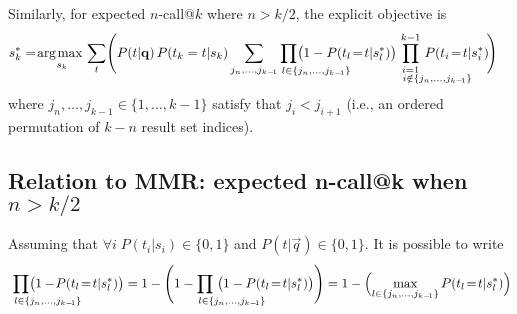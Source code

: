 Similarly, for expected $n$-call@$k$ where $n \! > \! k/2$, the explicit objective is
\begin{align}
  & s_k^* = \argmax_{s_k} \sum_t \Biggl( P(t|\vec{q}) \, P(t_k=t|s_k) \sum_{j_n, \dots, j_{k-\!1}} \hspace{-14mm} \prod_{\hspace{14.5mm} l \in \{j_n, \dots, j_{k-\!1}\}} \hspace{-14mm} \bigl(1 - P(t_l\!=\!t|s_l^*) \bigr) \hspace{-13mm} \prod_{\substack{i=1 \\ \hspace{14mm} i \notin \{j_n, \dots, j_{k-\!1}\}}}^{k-1} \hspace{-13mm} P(t_i\!=\!t|s_i^*) \!\Biggr) \label{eq.ncall.alt2}
\end{align}
where $j_n, \dots, j_{k-1} \in \{1,\ldots,k-1\}$ satisfy 
that $j_i < j_{i+1}$ (i.e.,
an ordered permutation of $k-n$ result set indices).

\subsection{Relation to MMR: expected n-call@k when $n>k/2$}
\label{appendix.2call}

Assuming that $\forall i \; P(t_i|s_i) \in \{0,1\}$ and $P(t|\vec{q}) \in \{0,1\}$. It is possible to write
\begin{align*}
  \hspace{-13mm} \prod_{\hspace{14.5mm} l \in \{j_n, \dots, j_{k-\!1}\}} \hspace{-14mm} \bigl( 1 - \!P(t_l\!=\!t|s_l^*) \bigr) 
  = 1 - \Biggl( 1 - \hspace{-14mm} \prod_{\hspace{14.5mm} l \in \{j_n, \dots, j_{k-\!1}\}} \hspace{-13mm} \bigl( 1 - P(t_l\!=\!t|s_l^*) \bigr) \Biggr)
  = 1 - \Bigl( \max_{l \in \{j_n, \dots, j_{k-\!1}\}} P(t_l\!=\!t|s_l^*) \Bigr)
\end{align*}

